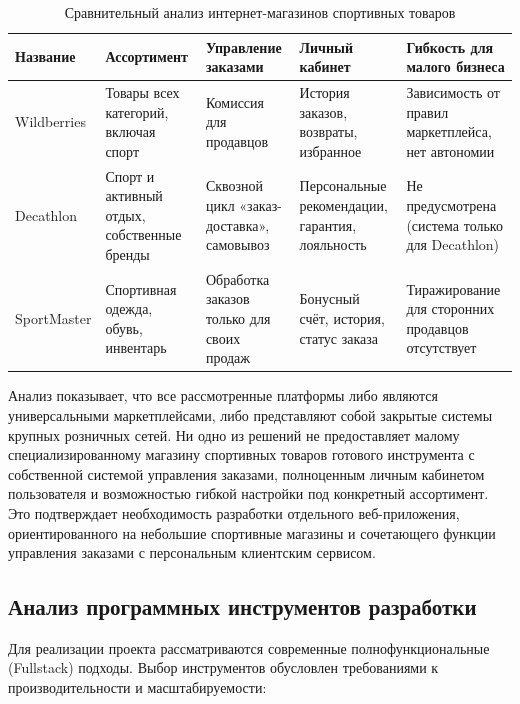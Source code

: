 \begin{table}[H]
    \centering
    \caption{Сравнительный анализ интернет-магазинов спортивных товаров}
    \label{tab:competitors}
    \begin{tabular}{|p{2.3cm}|p{2.8cm}|p{3.3cm}|p{2.9cm}|p{3.2cm}|}
        \hline
        \textbf{Название} & \textbf{Ассортимент} & \textbf{Управление заказами} & \textbf{Личный кабинет} & \textbf{Гибкость для малого бизнеса} \\ \hline
        Wildberries & Товары всех категорий, включая спорт & Комиссия для продавцов & История заказов, возвраты, избранное & Зависимость от правил маркетплейса, нет автономии \\ \hline
        Decathlon & Спорт и активный отдых, собственные бренды & Сквозной цикл «заказ-доставка», самовывоз & Персональные рекомендации, гарантия, лояльность & Не предусмотрена (система только для Decathlon) \\ \hline
        SportMaster & Спортивная одежда, обувь, инвентарь & Обработка заказов только для своих продаж & Бонусный счёт, история, статус заказа & Тиражирование для сторонних продавцов отсутствует \\ \hline
    \end{tabular}
\end{table}

Анализ показывает, что все рассмотренные платформы либо являются универсальными 
маркетплейсами, либо представляют собой закрытые системы крупных розничных сетей. 
Ни одно из решений не предоставляет малому специализированному магазину спортивных 
товаров готового инструмента с собственной системой управления заказами, 
полноценным личным кабинетом пользователя и возможностью гибкой настройки под 
конкретный ассортимент. Это подтверждает необходимость разработки отдельного 
веб-приложения, ориентированного на небольшие спортивные магазины и сочетающего 
функции управления заказами с персональным клиентским сервисом.






\subsection{Анализ программных инструментов разработки}

Для реализации проекта рассматриваются современные полнофункциональные (Fullstack)
подходы. Выбор инструментов обусловлен требованиями к производительности и
масштабируемости:




